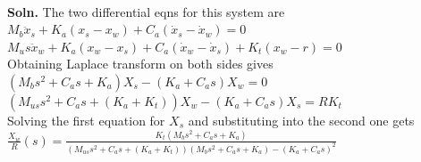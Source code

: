 \documentclass{homework}
\begin{document}
\maketitle

 \\
\textbf{Soln.}
The two differential eqns for this system are \\
$M_b \ddot{x}_s + K_a(x_s - x_w) + C_a(\dot{x}_s - \dot{x}_w) = 0$ \\
$M_us \ddot{x}_w + K_a(x_w - x_s) + C_a(\dot{x}_w - \dot{x}_s) + K_t(x_w - r) = 0$
\\


Obtaining Laplace transform on both sides gives \\
$(M_b s^2 + C_a s + K_a) X_s - (K_a + C_a s) X_w = 0$ \\
$(M_{us} s^2 + C_a s + (K_a + K_t)) X_w - (K_a + C_a s) X_s = R K_t$
\\


Solving the first equation for $X_s$ and substituting into the second one gets \\
$\frac{X_w}{R} (s) = \frac{K_t (M_b s^2 + C_a s + K_a)}{(M_{us} s^2 + C_a s + (K_a + K_t)) (M_b s^2 + C_a s + K_a) - (K_a + C_a s)^2}$
\end{document}

